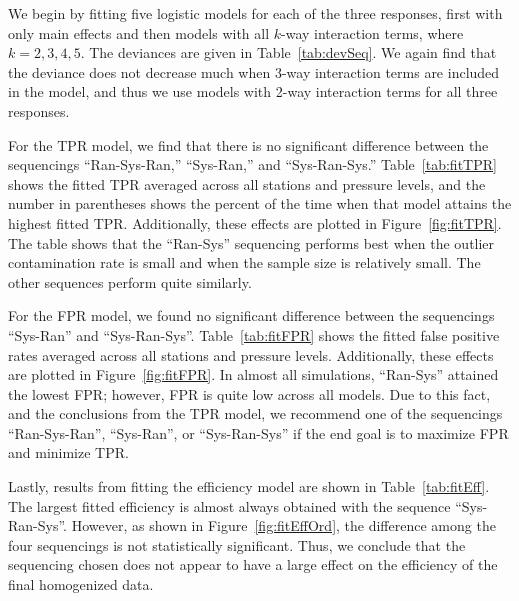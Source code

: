 \documentclass[12pt]{article}
\begin{document}
\begin{doublespacing}
We begin by fitting five logistic models for each of the three responses, first with only main effects and then models with all $k$-way interaction terms, where $k=2,3,4,5$.  The deviances are given in Table~\ref{tab:devSeq}.  We again find that the deviance does not decrease much when 3-way interaction terms are included in the model, and thus we use models with 2-way interaction terms for all three responses.

For the TPR model, we find that there is no significant difference between the sequencings ``Ran-Sys-Ran,'' ``Sys-Ran,'' and ``Sys-Ran-Sys.''  Table~\ref{tab:fitTPR} shows the fitted TPR averaged across all stations and pressure levels, and the number in parentheses shows the percent of the time when that model attains the highest fitted TPR.  Additionally, these effects are plotted in Figure~\ref{fig:fitTPR}.  The table shows that the ``Ran-Sys'' sequencing performs best when the outlier contamination rate is small and when the sample size is relatively small.  The other sequences perform quite similarly.  

For the FPR model, we found no significant difference between the sequencings ``Sys-Ran'' and ``Sys-Ran-Sys''.  Table~\ref{tab:fitFPR} shows the fitted false positive rates averaged across all stations and pressure levels.  Additionally, these effects are plotted in Figure~\ref{fig:fitFPR}.  In almost all simulations, ``Ran-Sys'' attained the lowest FPR; however, FPR is quite low across all models.  Due to this fact, and the conclusions from the TPR model, we recommend one of the sequencings ``Ran-Sys-Ran'', ``Sys-Ran'', or ``Sys-Ran-Sys'' if the end goal is to maximize FPR and minimize TPR.

Lastly, results from fitting the efficiency model are shown in Table~\ref{tab:fitEff}.  The largest fitted efficiency is almost always obtained with the sequence ``Sys-Ran-Sys''.  However, as shown in Figure~\ref{fig:fitEffOrd}, the difference among the four sequencings is not statistically significant.  Thus, we conclude that the sequencing chosen does not appear to have a large effect on the efficiency of the final homogenized data.



\end{doublespacing}
\end{document}
